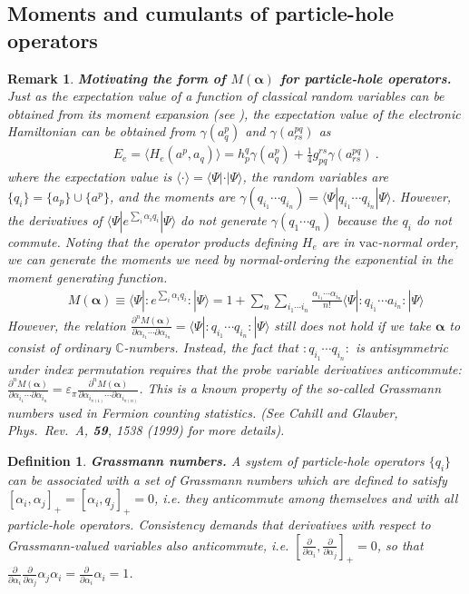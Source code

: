 \documentclass[11pt,fleqn]{article}
\renewcommand{\a}{\alpha}    %
\newcommand{\g}{\gamma}      %
\newcommand{\e}{\varepsilon} %
\newcommand{\Y}{\Psi}        %
\newcommand{\vac}{\ensuremath{\mathrm{vac}}}
\newcommand{\cd}{\ensuremath{\cdots}}
\newcommand{\bmit}[1]{{\bfseries\itshape\mathversion{bold}#1}}
\newcommand{\mb}[1]{\ensuremath{\mathbb{#1}}}
\newcommand{\pd}[2]{\ensuremath{\frac{\partial#1}{\partial#2}}}
\newcommand{\pt}{\ensuremath{\partial}}
\newcommand{\ip}[1]{\ensuremath{\langle#1\rangle}}
\newcommand{\NO}[1]{\ensuremath{{\bm{:}}#1{}{\bm{:}}}}
\theoremstyle{mystyle}
\newtheorem{dfn}{Definition}[section]
\newtheorem{rmk}{Remark}[section]
\numberwithin{equation}{section}
\begin{document}
\subsection{Moments and cumulants of particle-hole operators}

\begin{rmk}
\bmit{Motivating the form of $M(\bm\a)$ for particle-hole operators.}
Just as the expectation value of a function of classical random variables can be obtained from its moment expansion (see ), the expectation value of the electronic Hamiltonian can be obtained from $\g(a_q^p)$ and $\g(a_{rs}^{pq})$ as
\begin{align*}
&&
  E_e
=
  \ip{H_e(a^p,a_q)}
=
  h_p^q \g(a_q^p)
+
  \tfrac{1}{4}
  g_{pq}^{rs} \g(a_{rs}^{pq})\ .
\end{align*}
where the expectation value is $\ip{\cdot}=\ip{\Y|\cdot|\Y}$, the random variables are $\{q_i\}=\{a_p\}\cup\{a^p\}$, and the moments are $\g(q_{i_1}\cd q_{i_n})=\ip{\Y|q_{i_1}\cd q_{i_n}|\Y}$.
However, the derivatives of $\ip{\Y|e^{\sum_i\a_iq_i}|\Y}$ do not generate $\g(q_1\cd q_n)$ because the $q_i$ do not commute.
Noting that the operator products defining $H_e$ are in \vac-normal order, we can generate the moments we need by normal-ordering the exponential in the moment generating function.
\begin{align}
\label{moment-motivation}
&&
  M(\bm\a)
\equiv
  \ip{\Y|\NO{e^{\sum_i\a_iq_i}}|\Y}
=
  1
+
  \sum_n\sum_{i_1\cd i_n}\frac{\a_{i_1}\cd\a_{i_n}}{n!}
  \ip{\Y|\NO{q_{i_1}\cd a_{i_n}}|\Y}
\end{align}
However, the relation
$
  \pd{^nM(\bm\a)}{\a_{i_1}\cd\pt\a_{i_n}}
=
  \ip{\Y|\NO{q_{i_1}\cd q_{i_n}}|\Y}
$
still does not hold if we take $\bm\a$ to consist of ordinary $\mb{C}$-numbers.
Instead, the fact that $\NO{q_{i_1}\cd q_{i_n}}$ is antisymmetric under index permutation requires that the probe variable derivatives anticommute:
$
  \pd{^nM(\bm\a)}{\a_{i_1}\cd\pt\a_{i_n}}
=
  \e_\pi\pd{^nM(\bm\a)}{\a_{i_{\pi(1)}}\cd\pt\a_{i_{\pi(n)}}}
$.
This is a known property of the so-called \textit{Grassmann numbers} used in Fermion counting statistics.   (See Cahill and Glauber, \textit{Phys.~Rev.~A}, \textbf{59}, 1538 (1999) for more details).
\end{rmk}

\begin{dfn}
\bmit{Grassmann numbers.}
A system of particle-hole operators $\{q_i\}$ can be associated with a set of \textit{Grassmann numbers} which are defined to satisfy $[\a_i,\a_j]_+=[\a_i,q_j]_+=0$, i.e. they anticommute among themselves and with all particle-hole operators.
Consistency demands that derivatives with respect to Grassmann-valued variables also anticommute, i.e. $[\pd{}{\a_i},\pd{}{\a_j}]_+=0$, so that $\pd{}{\a_i}\pd{}{\a_j}\a_j\a_i=\pd{}{\a_i}\a_i=1$.
\end{dfn}
\end{document}
